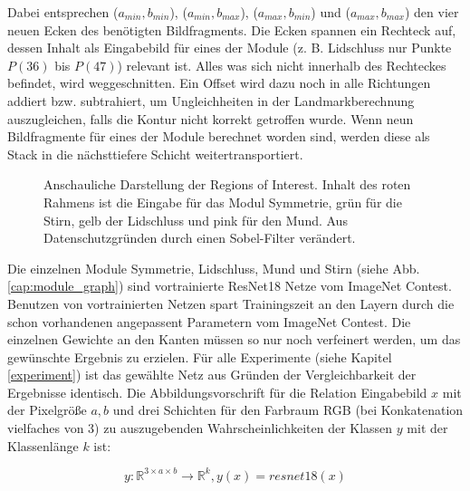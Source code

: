 Dabei entsprechen ($a_{min}, b_{min}$), ($a_{min}, b_{max}$), ($a_{max}, b_{min}$) und ($a_{max}, b_{max}$) den vier neuen Ecken des benötigten Bildfragments. Die Ecken spannen ein Rechteck auf, dessen Inhalt als Eingabebild für eines der Module (z. B. Lidschluss nur Punkte $P(36)$ bis $P(47)$) relevant ist. Alles was sich nicht innerhalb des Rechteckes befindet, wird weggeschnitten. Ein Offset wird dazu noch in alle Richtungen addiert bzw. subtrahiert, um Ungleichheiten in der Landmarkberechnung auszugleichen, falls die Kontur nicht korrekt getroffen wurde. Wenn neun Bildfragmente für eines der Module berechnet worden sind, werden diese als Stack in die nächsttiefere Schicht weitertransportiert.

\begin{figure}[!t]\centering
\vspace{-1.3cm}
\makebox[0pt]{}
\vspace{-1cm}
\caption[Anschauliche Darstellung der Regions of Interest]{Anschauliche Darstellung der Regions of Interest. Inhalt des roten Rahmens ist die Eingabe für das Modul Symmetrie, grün für die Stirn, gelb der Lidschluss und pink für den Mund. Aus Datenschutzgründen durch einen Sobel-Filter verändert.}\label{cap:r_of_interest}
\end{figure}\label{fig:r_of_interest}


Die einzelnen Module Symmetrie, Lidschluss, Mund und Stirn (siehe Abb. \ref{cap:module_graph}) sind vortrainierte ResNet18 Netze vom ImageNet Contest. Benutzen von vortrainierten Netzen spart Trainingszeit an den Layern durch die schon vorhandenen angepassent Parametern vom ImageNet Contest. Die einzelnen Gewichte an den Kanten müssen so nur noch verfeinert werden, um das gewünschte Ergebnis zu erzielen. Für alle Experimente (siehe Kapitel \ref{experiment}) ist das gewählte Netz aus Gründen der Vergleichbarkeit der Ergebnisse identisch. Die Abbildungsvorschrift für die Relation Eingabebild $x$ mit der Pixelgröße $a, b$ und drei Schichten für den Farbraum RGB (bei Konkatenation vielfaches von 3) zu auszugebenden Wahrscheinlichkeiten der Klassen $y$ mit der Klassenlänge $k$ ist:

\vspace{-0.6cm}
\begin{equation}
y: \mathbb{R}^{3 \times a \times b} \to \mathbb{R}^{k}, y(x) = resnet18(x)
\label{eq:resnet}
\end{equation}

